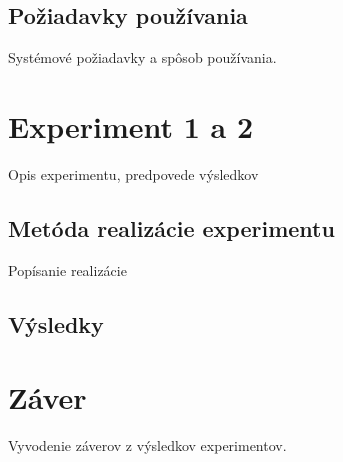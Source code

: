 \documentclass[10pt,oneside,slovak,a4paper]{article}
\begin{document}
\subsection{Požiadavky používania} \label{poziadavky}
Systémové požiadavky a spôsob používania.





\section{Experiment 1 a 2} \label{experiment}
Opis experimentu, predpovede výsledkov

\subsection {Metóda realizácie experimentu} \label{metoda_experimentu}
Popísanie realizácie

\subsection {Výsledky} \label {vysledky}

\section{Záver} \label{zaver}
Vyvodenie záverov z výsledkov experimentov.











\end{document}
